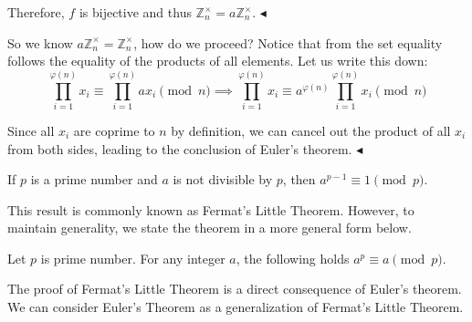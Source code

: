 \documentclass[../lecture-notes-148x210.tex]{subfiles}
\begin{document}
Therefore, $f$ is bijective and thus $\mathbb{Z}_n^{\times} = a\mathbb{Z}_n^{\times}$.
$\blacktriangleleft$

So we know $a\mathbb{Z}_n^{\times} = \mathbb{Z}_n^{\times}$, how do we proceed? Notice that 
from the set equality follows the equality of the products of all elements. Let us write this down:
\begin{equation*}
    \prod_{i = 1}^{\varphi(n)} x_i \equiv \prod_{i = 1}^{\varphi(n)} a x_i \pmod{n} \implies \prod_{i = 1}^{\varphi(n)} x_i \equiv a^{\varphi(n)} \prod_{i = 1}^{\varphi(n)} x_i \pmod{n}
\end{equation*}    
    
Since all $x_i$ are coprime to $n$ by definition, we can cancel out the product
of all $x_i$ from both sides, leading to the conclusion of Euler's theorem.
$\blacktriangleleft$

\begin{corollary} \label{cor:fermat_little_theorem}
    If $p$ is a prime number and $a$ is not divisible by $p$, then $a^{p - 1} \equiv 1 \pmod{p}$.
\end{corollary}
This result is commonly known as Fermat's Little Theorem. However, to maintain generality, 
we state the theorem in a more general form below.

\begin{theorem}  \label{th:fermat_little_theorem}
    Let $p$ is prime number. For any integer $a$, the following holds $a^{p} \equiv a \pmod{p}$.
\end{theorem}

The proof of Fermat's Little Theorem is a direct consequence of Euler's theorem.
We can consider Euler's Theorem as a generalization of Fermat's Little Theorem.
\end{document}
